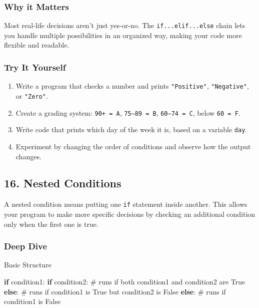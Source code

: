 \documentclass[
  letterpaper,
  DIV=11,
  numbers=noendperiod]{scrreprt}
\newenvironment{Shaded}{\begin{snugshade}}{\end{snugshade}}
\newcommand{\CommentTok}[1]{\textcolor[rgb]{0.37,0.37,0.37}{#1}}
\newcommand{\ControlFlowTok}[1]{\textcolor[rgb]{0.00,0.23,0.31}{\textbf{#1}}}
\newcommand{\NormalTok}[1]{\textcolor[rgb]{0.00,0.23,0.31}{#1}}
\providecommand{\tightlist}{%
  \setlength{\itemsep}{0pt}\setlength{\parskip}{0pt}}
\begin{document}
\subsubsection{Why it Matters}\label{why-it-matters-15}

Most real-life decisions aren't just yes-or-no. The
\texttt{if...elif...else} chain lets you handle multiple possibilities
in an organized way, making your code more flexible and readable.

\subsubsection{Try It Yourself}\label{try-it-yourself-15}

\begin{enumerate}
\def\labelenumi{\arabic{enumi}.}
\tightlist
\item
  Write a program that checks a number and prints \texttt{"Positive"},
  \texttt{"Negative"}, or \texttt{"Zero"}.
\item
  Create a grading system: \texttt{90+\ =\ A}, \texttt{75–89\ =\ B},
  \texttt{60–74\ =\ C}, below \texttt{60\ =\ F}.
\item
  Write code that prints which day of the week it is, based on a
  variable \texttt{day}.
\item
  Experiment by changing the order of conditions and observe how the
  output changes.
\end{enumerate}

\subsection{16. Nested Conditions}\label{nested-conditions}

A nested condition means putting one \texttt{if} statement inside
another. This allows your program to make more specific decisions by
checking an additional condition only when the first one is true.

\subsubsection{Deep Dive}\label{deep-dive-16}

Basic Structure

\begin{Shaded}
\begin{Highlighting}[]
\ControlFlowTok{if}\NormalTok{ condition1:}
    \ControlFlowTok{if}\NormalTok{ condition2:}
        \CommentTok{\# runs if both condition1 and condition2 are True}
    \ControlFlowTok{else}\NormalTok{:}
        \CommentTok{\# runs if condition1 is True but condition2 is False}
\ControlFlowTok{else}\NormalTok{:}
    \CommentTok{\# runs if condition1 is False}
\end{Highlighting}
\end{Shaded}
\end{document}
